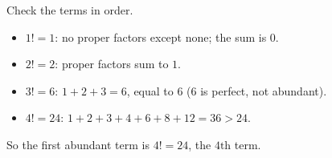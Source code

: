 Check the terms in order.
\begin{itemize}
\item $1!=1$: no proper factors except none; the sum is $0$.
\item $2!=2$: proper factors sum to $1$.
\item $3!=6$: $1+2+3=6$, equal to $6$ ($6$ is perfect, not abundant).
\item $4!=24$: $1+2+3+4+6+8+12=36>24$.
\end{itemize}
So the first abundant term is $4!=24$, the $\boxed{4\text{th}}$ term.
